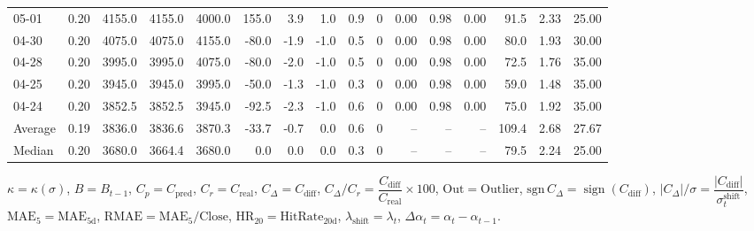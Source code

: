 \begin{threeparttable}
{\begin{tabular}{lrrrrrrrrrrrrrrr}
  05-01 &     0.20 & 4155.0 & 4155.0 & 4000.0 &      155.0 &            3.9 &                      1.0 &                 0.9 &              0 &       0.00 &      0.98 &           0.00 &             91.5 &            2.33 &                  25.00 \\
  04-30 &     0.20 & 4075.0 & 4075.0 & 4155.0 &      -80.0 &           -1.9 &                     -1.0 &                 0.5 &              0 &       0.00 &      0.98 &           0.00 &             80.0 &            1.93 &                  30.00 \\
  04-28 &     0.20 & 3995.0 & 3995.0 & 4075.0 &      -80.0 &           -2.0 &                     -1.0 &                 0.5 &              0 &       0.00 &      0.98 &           0.00 &             72.5 &            1.76 &                  35.00 \\
  04-25 &     0.20 & 3945.0 & 3945.0 & 3995.0 &      -50.0 &           -1.3 &                     -1.0 &                 0.3 &              0 &       0.00 &      0.98 &           0.00 &             59.0 &            1.48 &                  35.00 \\
  04-24 &     0.20 & 3852.5 & 3852.5 & 3945.0 &      -92.5 &           -2.3 &                     -1.0 &                 0.6 &              0 &       0.00 &      0.98 &           0.00 &             75.0 &            1.92 &                  35.00 \\
Average &     0.19 & 3836.0 & 3836.6 & 3870.3 &      -33.7 &           -0.7 &                      0.0 &                 0.6 &              0 &         -- &        -- &             -- &            109.4 &            2.68 &                  27.67 \\
 Median &     0.20 & 3680.0 & 3664.4 & 3680.0 &        0.0 &            0.0 &                      0.0 &                 0.3 &              0 &         -- &        -- &             -- &             79.5 &            2.24 &                  25.00 \\
\bottomrule
\end{tabular}
}
\begin{tablenotes}\footnotesize
\item $\kappa=\kappa(\sigma)$, $B=B_{t-1}$, $C_p=C_{\text{pred}}$, $C_r=C_{\text{real}}$, $C_\Delta=C_{\text{diff}}$, $C_\Delta/C_r=\dfrac{C_{\text{diff}}}{C_{\text{real}}}\times100$, $\mathrm{Out}=\text{Outlier}$, $\mathrm{sgn}\,C_\Delta=\operatorname{sign}(C_{\text{diff}})$, $|C_\Delta|/\sigma=\dfrac{|C_{\text{diff}}|}{\sigma_t^{\text{shift}}}$, $\mathrm{MAE}_5=\mathrm{MAE}_{5\text{d}}$, $\mathrm{RMAE}= \mathrm{MAE}_5 / \text{Close}$, $\mathrm{HR}_{20}=\mathrm{HitRate}_{20\text{d}}$, 
$\lambda_{\text{shift}}=\lambda_t$, 
$\Delta\alpha_t=\alpha_t-\alpha_{t-1}$.
\end{tablenotes}
\end{threeparttable}
\endgroup

